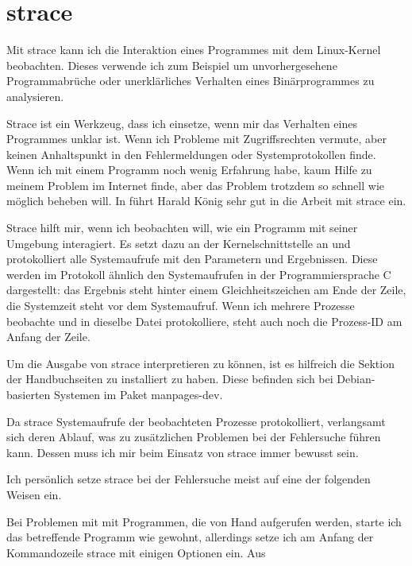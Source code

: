\section{strace}
\label{sec:lokal-werkzeuge-strace}

\begin{abstractsec}
  Mit strace kann ich die Interaktion eines Programmes mit dem Linux-Kernel
  beobachten. Dieses verwende ich zum Beispiel um unvorhergesehene
  Programmabrüche oder unerklärliches Verhalten eines Binärprogrammes zu
  analysieren.
\end{abstractsec}
\begin{normaltext}
  Strace ist ein Werkzeug, dass ich einsetze, wenn mir das Verhalten eines
  Programmes unklar ist. Wenn ich Probleme mit Zugriffsrechten vermute, aber
  keinen Anhaltspunkt in den Fehlermeldungen oder Systemprotokollen finde.
  Wenn ich mit einem Programm noch wenig Erfahrung habe, kaum Hilfe zu meinem
  Problem im Internet finde, aber das Problem trotzdem so schnell wie möglich
  beheben will.
  In \cite{guug:uptimes:2012.1/07} führt Harald König sehr gut in die Arbeit
  mit strace ein.
  
  Strace hilft mir, wenn ich beobachten will, wie ein Programm
  mit seiner Umgebung interagiert. Es setzt dazu an der Kernelschnittstelle
  an und protokolliert alle Systemaufrufe mit den Parametern und Ergebnissen.
  Diese werden im Protokoll ähnlich den Systemaufrufen in der
  Programmiersprache C dargestellt: das Ergebnis steht hinter einem
  Gleichheitszeichen am Ende der Zeile, die Systemzeit steht vor dem
  Systemaufruf. Wenn ich mehrere Prozesse beobachte und in dieselbe Datei
  protokolliere, steht auch noch die Prozess-ID am Anfang der Zeile.

  Um die Ausgabe von strace interpretieren zu können, ist es hilfreich die
  Sektion der Handbuchseiten zu installiert zu haben. Diese befinden sich bei
  Debian-basierten Systemen im Paket manpages-dev.

  Da strace Systemaufrufe der beobachteten Prozesse protokolliert, verlangsamt
  sich deren Ablauf, was zu zusätzlichen Problemen bei der Fehlersuche führen
  kann. Dessen muss ich mir beim Einsatz von strace immer bewusst sein.

  Ich persönlich setze strace bei der Fehlersuche meist auf eine der folgenden
  Weisen ein.

  Bei Problemen mit mit Programmen, die von Hand aufgerufen werden, starte ich
  das betreffende Programm wie gewohnt, allerdings setze ich am Anfang der
  Kommandozeile strace mit einigen Optionen ein. Aus


\end{normaltext}
